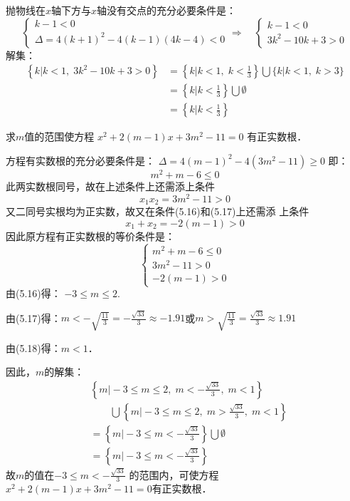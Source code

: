\begin{solution}
    抛物线在$x$轴下方与$x$轴没有交点的充分必要条件是：
\[\begin{cases}
    k-1<0 \\ \Delta=4(k+1)^2-4(k-1)(4k-4)<0
\end{cases}\Rightarrow \quad \begin{cases}
    k-1<0 \\ 3k^2-10k+3>0
\end{cases}\]
解集：
\[\begin{split}
\left\{k|k<1,\; 3k^2-10k+3>0 \right\}&=\left\{k\Big|k<1,\; k<\frac{1}{3} \right\}\bigcup\{k|k<1,\; k>3 \}\\
&=\left\{k\Big|k<\frac{1}{3} \right\}\bigcup\emptyset\\
&=\left\{k\Big|k<\frac{1}{3} \right\}
\end{split}\]
\end{solution}

\begin{example}
    求$m$值的范围使方程
    $x^2+2(m-1)x+3m^2-11=0$
    有正实数根．
\end{example}

\begin{solution}
方程有实数根的充分必要条件是：
$\Delta=4(m-1)^2-4(3m^2-11)\ge 0$
即：
\begin{equation}
    m^2+m-6\le 0
\end{equation}
此两实数根同号，故在上述条件上还需添上条件
\begin{equation}
    x_1x_2=3m^2-11>0
\end{equation}
又二同号实根均为正实数，故又在条件(5.16)和(5.17)上还需添
上条件
\begin{equation}
    x_1+x_2=-2(m-1)>0
\end{equation}
因此原方程有正实数根的等价条件是：
\[\begin{cases}
    m^2+m-6\le 0\\
    3m^2-11>0\\
    -2(m-1)>0
\end{cases}\]
由(5.16)得：
$-3\le m\le 2$.

由(5.17)得：$m<-\sqrt{\frac{11}{3}}=-\frac{\sqrt{33}}{3}\approx -1.91$或$m>\sqrt{\frac{11}{3}}=\frac{\sqrt{33}}{3}\approx 1.91$

由(5.18)得：$m<1$．

因此，$m$的解集：
\[\begin{split}
   & \left\{m\Big|-3\le m\le 2,\; m<-\frac{\sqrt{33}}{3},\; m<1\right\}\\
   &\qquad \bigcup\left\{m\Big|-3\le m\le 2,\; m>\frac{\sqrt{33}}{3},\; m<1\right\}\\
    &=\left\{m\Big|-3\le m<-\frac{\sqrt{33}}{3}\right\}\bigcup \emptyset\\
    &=\left\{m\Big|-3\le m<-\frac{\sqrt{33}}{3}\right\}
\end{split}\]
故$m$的值在$-3\le m<-\frac{\sqrt{33}}{3}$
的范围内，可使方程$x^2+2(m-1)x+3m^2-11=0$有正实数根．
\end{solution}

